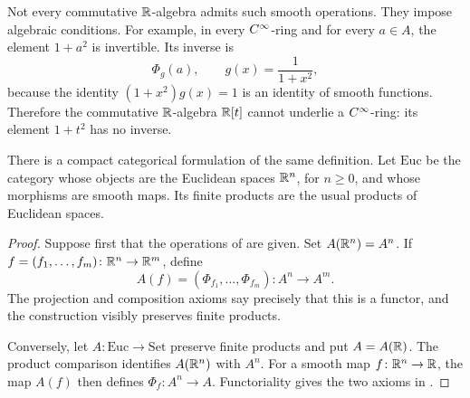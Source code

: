 
Not every commutative $\mathbb{R}$-algebra admits such smooth operations.
They impose algebraic conditions. For example, in every $C^\infty$-ring and for every $a\in A$, the
element $1+a^2$ is invertible. Its inverse is
\[
  \Phi_g(a),
  \qquad
  g(x)=\frac{1}{1+x^2},
\]
because the identity $(1+x^2)g(x)=1$ is an identity of smooth functions.
Therefore the commutative $\mathbb{R}$-algebra $\mathbb{R}[t]$ cannot underlie a
$C^\infty$-ring: its element $1+t^2$ has no inverse.

There is a compact categorical formulation of the same definition. Let
$\mathrm{Euc}$ be the category whose objects are the Euclidean spaces
$\mathbb{R}^n$, for $n\geq 0$, and whose morphisms are smooth maps. Its finite
products are the usual products of Euclidean spaces.


\begin{proof}
  Suppose first that the operations of
   are given. Set
  $A(\mathbb{R}^n)=A^n$. If
  $f=(f_1,\ldots,f_m)\colon\mathbb{R}^n\to\mathbb{R}^m$, define
  \[
    A(f)=(\Phi_{f_1},\ldots,\Phi_{f_m})\colon A^n\longrightarrow A^m.
  \]
  The projection and composition axioms say precisely that this is a functor,
  and the construction visibly preserves finite products.

  Conversely, let $A\colon\mathrm{Euc}\to\mathrm{Set}$ preserve finite
  products and put $A=A(\mathbb{R})$. The product comparison identifies
  $A(\mathbb{R}^n)$ with $A^n$. For a smooth map $f\colon\mathbb{R}^n\to\mathbb{R}$, the map $A(f)$
  then defines $\Phi_f\colon A^n\to A$. Functoriality gives the two axioms in
  .
\end{proof}

